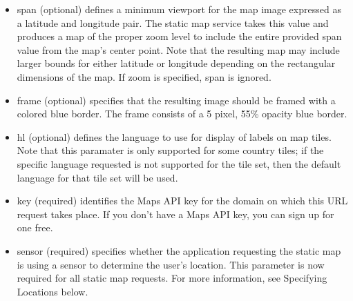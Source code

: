 \documentclass{article}
\begin{document}
\begin{itemize}
    \item span (optional) defines a minimum viewport for the map image expressed as a latitude and longitude pair. The static map service takes this value and produces a map of the proper zoom level to include the entire provided span value from the map's center point. Note that the resulting map may include larger bounds for either latitude or longitude depending on the rectangular dimensions of the map. If zoom is specified, span is ignored.
    \item frame (optional) specifies that the resulting image should be framed with a colored blue border. The frame consists of a 5 pixel, 55\% opacity blue border.
    \item hl (optional) defines the language to use for display of labels on map tiles. Note that this paramater is only supported for some country tiles; if the specific language requested is not supported for the tile set, then the default language for that tile set will be used.
    \item key (required) identifies the Maps API key for the domain on which this URL request takes place. If you don't have a Maps API key, you can sign up for one free.
    \item sensor (required) specifies whether the application requesting the static map is using a sensor to determine the user's location. This parameter is now required for all static map requests. For more information, see Specifying Locations below.
\end{itemize}


\end{document}
